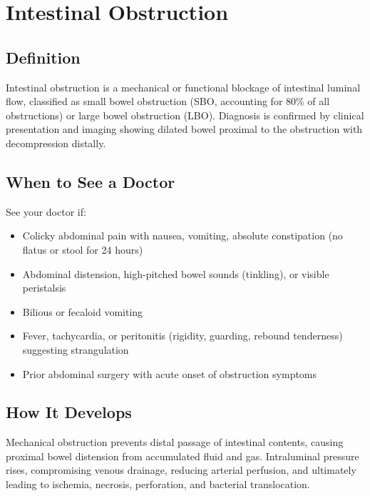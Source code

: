 \chapter{Intestinal Obstruction}

\section*{Definition}
Intestinal obstruction is a mechanical or functional blockage of intestinal luminal flow, classified as small bowel obstruction (SBO, accounting for 80\% of all obstructions) or large bowel obstruction (LBO). Diagnosis is confirmed by clinical presentation and imaging showing dilated bowel proximal to the obstruction with decompression distally.

\section*{When to See a Doctor}
See your doctor if:
\begin{itemize}
  \item Colicky abdominal pain with nausea, vomiting, absolute constipation (no flatus or stool for 24 hours)
  \item Abdominal distension, high-pitched bowel sounds (tinkling), or visible peristalsis
  \item Bilious or fecaloid vomiting
  \item Fever, tachycardia, or peritonitis (rigidity, guarding, rebound tenderness) suggesting strangulation
  \item Prior abdominal surgery with acute onset of obstruction symptoms
\end{itemize}

\section*{How It Develops}
Mechanical obstruction prevents distal passage of intestinal contents, causing proximal bowel distension from accumulated fluid and gas. Intraluminal pressure rises, compromising venous drainage, reducing arterial perfusion, and ultimately leading to ischemia, necrosis, perforation, and bacterial translocation.

